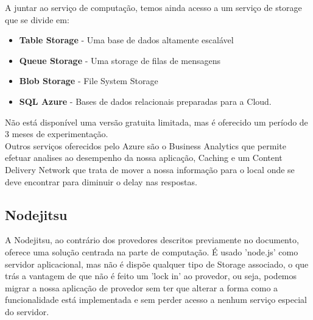 A juntar ao serviço de computação, temos ainda acesso a um serviço de storage que se divide em:
\begin{itemize}
\item {\bf Table Storage } -  Uma base de dados altamente escalável
\item {\bf Queue Storage  }- Uma storage de filas de mensagens
\item {\bf Blob Storage }- File System Storage
\item {\bf SQL Azure }- Bases de dados relacionais preparadas para a Cloud.
\end{itemize}	

Não está disponível uma versão gratuita limitada, mas é oferecido um período de 3 meses de experimentação.\\
Outros serviços oferecidos pelo Azure são o Business Analytics que permite efetuar analises ao desempenho da nossa aplicação, Caching e um Content Delivery Network que trata de mover a nossa informação para o local onde se deve encontrar para diminuir o delay nas respostas.


\subsection{Nodejitsu}
A Nodejitsu, ao contrário dos provedores descritos previamente no documento, oferece uma solução centrada na parte de computação. É usado 'node.js' como servidor aplicacional, mas não é dispõe qualquer tipo de Storage associado, o que trás a vantagem de que não é feito um 'lock in' ao provedor, ou seja, podemos migrar a nossa aplicação de provedor sem ter que alterar a forma como a funcionalidade está implementada e sem perder acesso a nenhum serviço especial do servidor.







